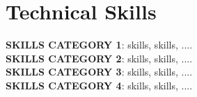 \section{Technical Skills}
 \begin{itemize}[leftmargin=0.15in, label={}]
    \small{\item{
     \textbf{SKILLS CATEGORY 1}{: skills, skills, ....} \\
     \vspace{1pt}
     \textbf{SKILLS CATEGORY 2}{: skills, skills, ....} \\
     \vspace{1pt}
     \textbf{SKILLS CATEGORY 3}{: skills, skills, ....} \\
     \vspace{1pt}
     \textbf{SKILLS CATEGORY 4}{: skills, skills, ....} \\
     \vspace{1pt}
    }}
 \end{itemize}